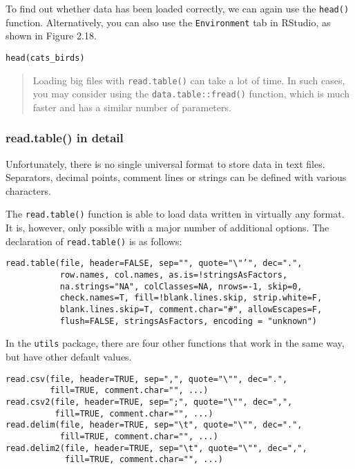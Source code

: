 \documentclass[]{book}
\theoremstyle{definition}
\theoremstyle{definition}
\theoremstyle{definition}
\theoremstyle{remark}
\begin{document}
To find out whether data has been loaded correctly, we can again use the
\texttt{head()} function. Alternatively, you can also use the
\texttt{Environment} tab in RStudio, as shown in Figure 2.18.

\begin{verbatim}
head(cats_birds)
\end{verbatim}

\begin{quote}
Loading big files with \texttt{read.table()} can take a lot of time. In
such cases, you may consider using the \texttt{data.table::fread()}
function, which is much faster and has a similar number of parameters.
\end{quote}

\subsubsection{read.table() in detail}\label{part_2621}

Unfortunately, there is no single universal format to store data in text
files. Separators, decimal points, comment lines or strings can be
defined with various characters.

The \texttt{read.table()} function is able to load data written in
virtually any format. It is, however, only possible with a major number
of additional options. The declaration of \texttt{read.table()} is as
follows:

\begin{verbatim}
read.table(file, header=FALSE, sep="", quote="\"’", dec=".",
           row.names, col.names, as.is=!stringsAsFactors,
           na.strings="NA", colClasses=NA, nrows=-1, skip=0,
           check.names=T, fill=!blank.lines.skip, strip.white=F,
           blank.lines.skip=T, comment.char="#", allowEscapes=F,
           flush=FALSE, stringsAsFactors, encoding = "unknown")
\end{verbatim}

In the \texttt{utils} package, there are four other functions that work
in the same way, but have other default values.

\begin{verbatim}
read.csv(file, header=TRUE, sep=",", quote="\"", dec=".",
         fill=TRUE, comment.char="", ...)
read.csv2(file, header=TRUE, sep=";", quote="\"", dec=",",
          fill=TRUE, comment.char="", ...)
read.delim(file, header=TRUE, sep="\t", quote="\"", dec=".",
           fill=TRUE, comment.char="", ...)
read.delim2(file, header=TRUE, sep="\t", quote="\"", dec=",",
            fill=TRUE, comment.char="", ...)
\end{verbatim}
\end{document}
